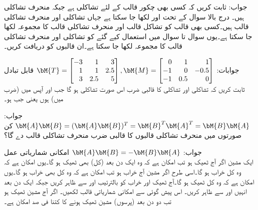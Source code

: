 جواب:
ثابت کریں  کہ کسی بھی چکور قالب  کے لئے  تشاکلی ہے جبکہ  منحرف تشاکلی ہیں۔
درج بالا سوال کے تحت  اور  لکھا جا سکتا ہے جہاں  تشاکلی اور  منحرف تشاکلی قالب ہیں۔کسی بھی قالب کو تشاکل قالب اور منحرف تشاکلی قالب کا مجموعہ لکھا جا سکتا ہے۔یوں سوال  تا سوال  میں استعمال کیے گئے  کو تشاکلی اور منحرف تشاکلی قالب کا مجموعہ لکھا جا سکتا ہے۔ان قالبوں کو دریافت کریں۔

جوابات:
$\bM{T}=\begin{bmatrix*}[r] -3&1&3\\1&1&2.5\\3&2.5&5 \end{bmatrix*}, \bM{M}=\begin{bmatrix*}[r] 0&1&1\\-1&0&-0.5\\-1&0.5&0 \end{bmatrix*}$
\quad قابل تبادل\\
ثابت کریں کہ تشاکلی  اور تشاکلی  کا قالبی ضرب  اس صورت تشاکلی ہو گا جب  اور   آپس میں (ضرب میں)  ہوں یعنی جب  ہو۔

جواب:
$\bM{A}\bM{B}=(\bM{A}\bM{B})^T=\bM{B}^T\bM{A}^T=\bM{B}\bM{A}$
کن صورتوں میں منحرف تشاکلی قالبوں کا قالبی ضرب منحرف تشاکلی قالب دے گا؟

جواب:
$\bM{A}\bM{B}=-\bM{B}\bM{A}$
\quad امکانی شماریاتی عمل\\
ایک مشین اگر آج ٹھیک ہو تب  امکان ہے کہ وہ ایک دن بعد (کل) بھی ٹھیک ہو گا۔یوں  امکان ہے کہ وہ کل خراب ہو گا۔اسی طرح اگر مشین آج خراب ہو تب  امکان ہے کہ وہ کل بھی خراب ہو گا۔یوں  امکان ہے کہ وہ کل ٹھیک ہو گا۔آج ٹھیک اور خراب کو بالترتیب  اور  سے ظاہر کریں جبکہ ایک دن بعد انہیں  اور  سے ظاہر کریں۔ اس پیش گوئی سے امکانی شماریاتی قالب  لکھیں۔ اگر آج مشین ٹھیک ہو تب دو دن بعد (پرسوں) مشین ٹھیک ہونے کا کتنا فی صد امکان ہے۔ 

